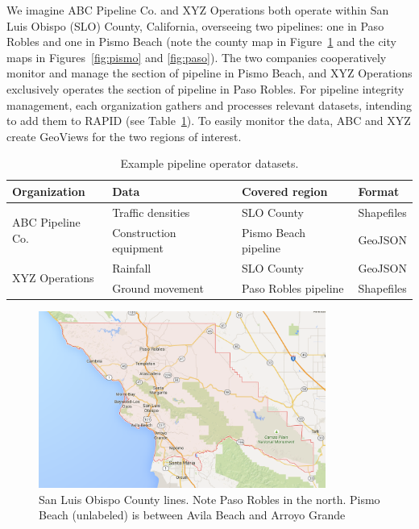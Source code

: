 We imagine ABC Pipeline Co. and XYZ Operations both operate within San Luis Obispo (SLO) County, California, overseeing two pipelines: one in Paso Robles and one in Pismo Beach (note the county map in Figure~\ref{fig:county} and the city maps in Figures~\ref{fig:pismo} and \ref{fig:paso}). The two companies cooperatively monitor and manage the section of pipeline in Pismo Beach, and XYZ Operations exclusively operates the section of pipeline in Paso Robles. For pipeline integrity management, each organization gathers and processes relevant datasets, intending to add them to RAPID (see Table~\ref{table:layers}). To easily monitor the data, ABC and XYZ create GeoViews for the two regions of interest.

\begin{table}[ht]

\begin{tabular}{ |l|l|l|l| }
\hline
Organization & Data & Covered region & Format\\
\hline
\multirow{2}{*}{ABC Pipeline Co.}
 & Traffic densities & SLO County & Shapefiles \\ \cline{2-4}
 & Construction equipment & Pismo Beach pipeline & GeoJSON \\ \hline
\multirow{2}{*}{XYZ Operations}
 & Rainfall & SLO County & GeoJSON \\ \cline{2-4}
 & Ground movement & Paso Robles pipeline & Shapefiles \\ \hline
\end{tabular}
\caption{Example pipeline operator datasets.}
\label{table:layers}
\end{table}

\begin{figure}[ht]
\vspace{8pt}
    \centering
    \includegraphics[width=0.84\textwidth]{figures/county.png}
    \caption{San Luis Obispo County lines. Note Paso Robles in the north. Pismo Beach (unlabeled) is between Avila Beach and Arroyo Grande}
    \label{fig:county}
\end{figure}

